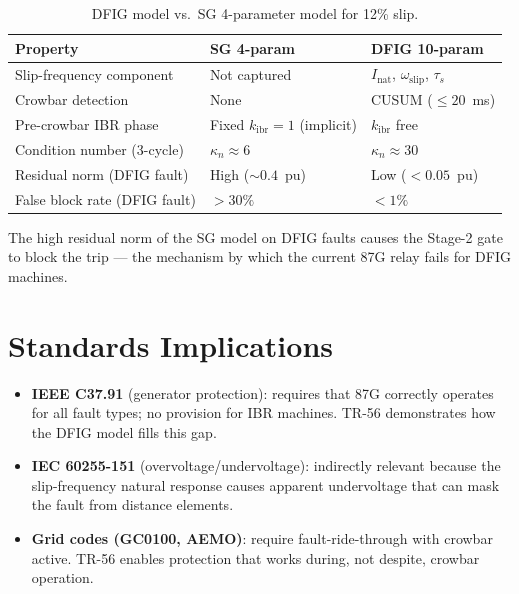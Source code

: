 \documentclass[11pt,a4paper]{article}
\newcommand{\omegas}{\omega_{\text{slip}}}
\newcommand{\taus}{\tau_s}
\begin{document}
\begin{table}[ht]
  \centering
  \caption{DFIG model vs.\ SG 4-parameter model for 12\% slip.}
  \label{tab:compare}
  \begin{tabular}{lll}
    \toprule
    Property & SG 4-param & DFIG 10-param \\
    \midrule
    Slip-frequency component & Not captured & $I_{\text{nat}}$, $\omegas$, $\taus$ \\
    Crowbar detection & None & CUSUM ($\leq 20$~ms) \\
    Pre-crowbar IBR phase & Fixed $k_{\text{ibr}}=1$ (implicit) & $k_{\text{ibr}}$ free \\
    Condition number (3-cycle) & $\kappa_n \approx 6$ & $\kappa_n \approx 30$ \\
    Residual norm (DFIG fault) & High ($\sim 0.4$~pu) & Low ($<0.05$~pu) \\
    False block rate (DFIG fault) & $>30\%$ & $<1\%$ \\
    \bottomrule
  \end{tabular}
\end{table}

The high residual norm of the SG model on DFIG faults causes the Stage-2
gate to block the trip — the mechanism by which the current 87G relay fails
for DFIG machines.

\section{Standards Implications}
\label{sec:standards}

\begin{itemize}
  \item \textbf{IEEE C37.91} (generator protection): requires that 87G
        correctly operates for all fault types; no provision for IBR machines.
        TR-56 demonstrates how the DFIG model fills this gap.

  \item \textbf{IEC 60255-151} (overvoltage/undervoltage): indirectly
        relevant because the slip-frequency natural response causes
        apparent undervoltage that can mask the fault from distance elements.

  \item \textbf{Grid codes (GC0100, AEMO)}: require fault-ride-through with
        crowbar active.  TR-56 enables protection that works during, not
        despite, crowbar operation.
\end{itemize}
\end{document}
